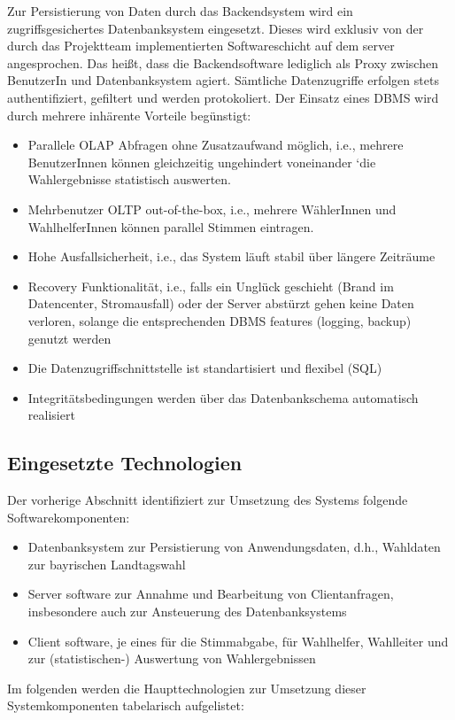 \documentclass[a4paper,12pt]{article}
\begin{document}
Zur Persistierung von Daten durch das Backendsystem wird ein zugriffsgesichertes Datenbanksystem eingesetzt. Dieses
wird exklusiv von der durch das Projektteam implementierten Softwareschicht auf dem server angesprochen.
Das heißt, dass die Backendsoftware lediglich als Proxy zwischen BenutzerIn und Datenbanksystem agiert. Sämtliche 
Datenzugriffe erfolgen stets authentifiziert, gefiltert und werden protokoliert. 
%
Der Einsatz eines DBMS wird durch mehrere inhärente Vorteile begünstigt:

\begin{itemize}
      \item Parallele OLAP Abfragen ohne Zusatzaufwand möglich, i.e., mehrere BenutzerInnen können 
            gleichzeitig ungehindert voneinander `die Wahlergebnisse statistisch auswerten.
      \item Mehrbenutzer OLTP out-of-the-box, i.e., mehrere WählerInnen und WahlhelferInnen können parallel Stimmen
            eintragen.
      \item Hohe Ausfallsicherheit, i.e., das System läuft stabil über längere Zeiträume
      \item Recovery Funktionalität, i.e., falls ein Unglück geschieht (Brand im Datencenter, Stromausfall) 
            oder der Server abstürzt gehen keine Daten verloren, solange die entsprechenden DBMS features 
            (logging, backup) genutzt werden
      \item Die Datenzugriffschnittstelle ist standartisiert und flexibel (SQL)
      \item Integritätsbedingungen werden über das Datenbankschema automatisch realisiert
\end{itemize}

\subsection{Eingesetzte Technologien}
Der vorherige Abschnitt identifiziert zur Umsetzung des Systems folgende Softwarekomponenten:
\begin{itemize}
      \item Datenbanksystem zur Persistierung von Anwendungsdaten, d.h., Wahldaten zur bayrischen Landtagswahl
      \item Server software zur Annahme und Bearbeitung von Clientanfragen, insbesondere auch zur Ansteuerung des Datenbanksystems
      \item Client software, je eines für die Stimmabgabe, für Wahlhelfer, Wahlleiter und zur (statistischen-) Auswertung von Wahlergebnissen 
\end{itemize}
Im folgenden werden die Haupttechnologien zur Umsetzung dieser Systemkomponenten tabelarisch aufgelistet:
\end{document}
